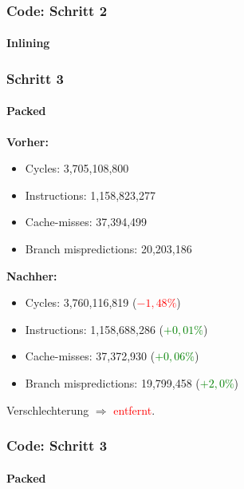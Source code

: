 \documentclass{beamer}
\newcommand{\success}[1]{\textcolor{green}{#1}}
\newcommand{\fail}[1]{\textcolor{red}{#1}}
\begin{document}
    \begin{frame}
  	\frametitle{Code: Schritt 2}
		\framesubtitle{Inlining}
		\sInlining	
  \end{frame}
  
  
  \begin{frame}
  	\frametitle{Schritt 3}
  	\framesubtitle{Packed}
  	\textbf{Vorher:}
  	\begin{itemize}
			\item Cycles: 3,705,108,800 \\
			\item Instructions: 1,158,823,277\\
			\item Cache-misses: 37,394,499\\
			\item Branch mispredictions: 20,203,186\\
		\end{itemize}	
		
		\textbf{Nachher:}
		\begin{itemize}
			\item Cycles: 3,760,116,819 (\fail{$- 1,48 \%$})\\
			\item Instructions: 1,158,688,286 (\success{$+ 0,01\%$})\\
			\item Cache-misses: 37,372,930 (\success{$+ 0,06 \%$})\\
			\item Branch mispredictions: 19,799,458 (\success{$+ 2,0\%$})\\
		\end{itemize}	
		Verschlechterung $\Rightarrow$ \fail{entfernt}.
  \end{frame}
  
    \begin{frame}
  	\frametitle{Code: Schritt 3}
  	\framesubtitle{Packed}
		\sPacked
  \end{frame}
    
\end{document}
